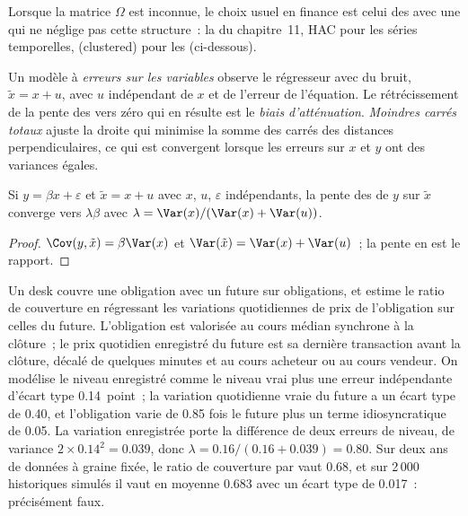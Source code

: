 Lorsque la matrice $\Omega$ est inconnue, le choix usuel en finance est celui des  avec une  qui ne néglige pas cette structure~: la 
du chapitre~11, HAC pour les séries temporelles,  (clustered) pour les  (ci-dessous).

\begin{definition}\label{def:qm:linear-models-under-stress:eiv}
Un modèle à \emph{erreurs sur les variables} observe le régresseur avec du bruit, $\tilde x = x + u$, avec $u$ indépendant de $x$
et de l'erreur de l'équation. Le rétrécissement de la pente des  vers zéro qui en résulte est le \emph{biais d'atténuation}. \emph{Moindres
carrés totaux} ajuste la droite qui minimise la somme des carrés des distances perpendiculaires, ce qui est convergent lorsque les erreurs sur
$x$ et $y$ ont des variances égales.
\end{definition}

\begin{proposition}\label{prop:qm:linear-models-under-stress:attenuation}
Si $y = \beta x + \varepsilon$ et $\tilde x = x + u$ avec $x$, $u$, $\varepsilon$ indépendants, la pente des  de $y$ sur $\tilde x$ converge vers
$\lambda\beta$ avec $\lambda = \Var(x)/(\Var(x) + \Var(u))$.
\end{proposition}

\begin{proof}
$\Cov(y, \tilde x) = \beta\Var(x)$ et $\Var(\tilde x) = \Var(x) + \Var(u)$~; la pente en est le rapport.
\end{proof}

Un desk couvre une obligation avec un future sur obligations, et estime le ratio de couverture en régressant les variations quotidiennes de prix de l'obligation sur celles du future. L'obligation
est valorisée au cours médian synchrone à la clôture~; le prix quotidien enregistré du future est sa dernière transaction avant la clôture, décalé de quelques minutes et
au cours acheteur ou au cours vendeur. On modélise le niveau enregistré comme le niveau vrai plus une erreur indépendante d'écart type 0.14~point~; la variation quotidienne vraie du
future a un écart type de 0.40, et l'obligation varie de 0.85 fois le future plus un terme idiosyncratique de 0.05. La variation enregistrée porte
la différence de deux erreurs de niveau, de variance $2 \times 0.14^2 = 0.039$, donc $\lambda = 0.16/(0.16 + 0.039) = 0.80$. Sur deux ans de données
à graine fixée, le ratio de couverture par  vaut 0.68, et sur 2\,000 historiques simulés il vaut en moyenne 0.683 avec un écart type de 0.017~: précisément faux.

